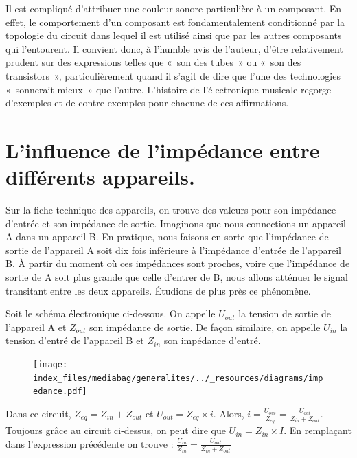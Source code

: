 \documentclass[
  letterpaper,
  DIV=11,
  numbers=noendperiod]{scrreprt}
\begin{document}
Il est compliqué d'attribuer une couleur sonore particulière à un
composant. En effet, le comportement d'un composant est fondamentalement
conditionné par la topologie du circuit dans lequel il est utilisé ainsi
que par les autres composants qui l'entourent. Il convient donc, à
l'humble avis de l'auteur, d'être relativement prudent sur des
expressions telles que «~son des tubes~» ou «~son des transistors~»,
particulièrement quand il s'agit de dire que l'une des technologies
«~sonnerait mieux~» que l'autre. L'histoire de l'électronique musicale
regorge d'exemples et de contre-exemples pour chacune de ces
affirmations.

\hypertarget{linfluence-de-limpuxe9dance-entre-diffuxe9rents-appareils.}{%
\section{L'influence de l'impédance entre différents
appareils.}\label{linfluence-de-limpuxe9dance-entre-diffuxe9rents-appareils.}}

Sur la fiche technique des appareils, on trouve des valeurs pour son
impédance d'entrée et son impédance de sortie. Imaginons que nous
connections un appareil A dans un appareil B. En pratique, nous faisons
en sorte que l'impédance de sortie de l'appareil A soit dix fois
inférieure à l'impédance d'entrée de l'appareil B. À partir du moment où
ces impédances sont proches, voire que l'impédance de sortie de A soit
plus grande que celle d'entrer de B, nous allons atténuer le signal
transitant entre les deux appareils. Étudions de plus près ce phénomène.

Soit le schéma électronique ci-dessous. On appelle \(U_{out}\) la
tension de sortie de l'appareil A et \(Z_{out}\) son impédance de
sortie. De façon similaire, on appelle \(U_{in}\) la tension d'entré de
l'appareil B et \(Z_{in}\) son impédance d'entré.

\begin{figure}

{\centering \texttt{[image: index\_files/mediabag/generalites/../\_resources/diagrams/impedance.pdf]}

}

\end{figure}

Dans ce circuit, \(Z_{eq} = Z_{in} + Z_{out}\) et
\(U_{out} = Z_{eq} \times i\). Alors,
\(i = \frac{U_{out}}{Z_{eq}} = \frac{U_{out}}{Z_{in} + Z_{out}}\).
Toujours grâce au circuit ci-dessus, on peut dire que
\(U_{in} = Z_{in} \times I\). En remplaçant dans l'expression précédente
on trouve : \(\frac{U_{in}}{Z_{in}} = \frac{U_{out}}{Z_{in} + Z_{out}}\)
\end{document}
